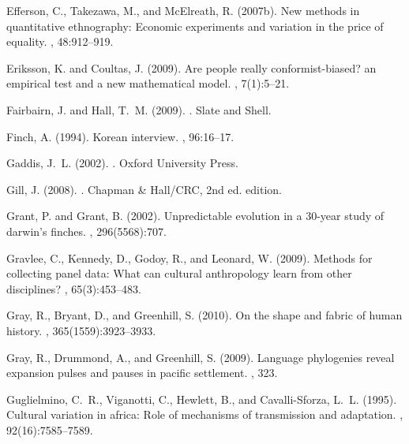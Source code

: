 Efferson, C., Takezawa, M., and McElreath, R. (2007b).
\newblock New methods in quantitative ethnography: Economic experiments and
  variation in the price of equality.
, 48:912--919.

Eriksson, K. and Coultas, J. (2009).
\newblock Are people really conformist-biased? an empirical test and a new
  mathematical model.
, 7(1):5--21.

Fairbairn, J. and Hall, T.~M. (2009).
.
\newblock Slate and Shell.

Finch, A. (1994).
\newblock Korean interview.
, 96:16--17.

Gaddis, J.~L. (2002).
.
\newblock Oxford University Press.

Gill, J. (2008).
.
\newblock Chapman \& Hall/CRC, 2nd ed. edition.

Grant, P. and Grant, B. (2002).
\newblock Unpredictable evolution in a 30-year study of darwin's finches.
, 296(5568):707.

Gravlee, C., Kennedy, D., Godoy, R., and Leonard, W. (2009).
\newblock Methods for collecting panel data: What can cultural anthropology
  learn from other disciplines?
, 65(3):453--483.

Gray, R., Bryant, D., and Greenhill, S. (2010).
\newblock On the shape and fabric of human history.
, 365(1559):3923--3933.

Gray, R., Drummond, A., and Greenhill, S. (2009).
\newblock Language phylogenies reveal expansion pulses and pauses in pacific
  settlement.
, 323.

Guglielmino, C.~R., Viganotti, C., Hewlett, B., and Cavalli-Sforza, L.~L.
  (1995).
\newblock Cultural variation in africa: Role of mechanisms of transmission and
  adaptation.
, 92(16):7585--7589.

